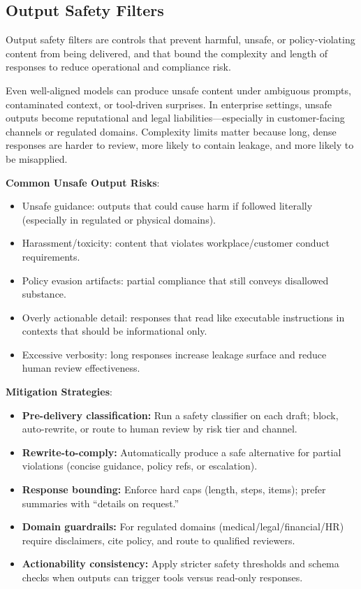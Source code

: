 \begin{TNtwocol}
    \section{Output Safety Filters }

    Output safety filters are controls that prevent harmful, unsafe, or policy-violating content from being delivered, and that bound the complexity and length of responses to reduce operational and compliance risk.

    Even well-aligned models can produce unsafe content under ambiguous prompts, contaminated context, or tool-driven surprises. In enterprise settings, unsafe outputs become reputational and legal liabilities—especially in customer-facing channels or regulated domains. Complexity limits matter because long, dense responses are harder to review, more likely to contain leakage, and more likely to be misapplied.

    \textbf{Common Unsafe Output Risks}:
    \begin{itemize}
        \item Unsafe guidance: outputs that could cause harm if followed literally (especially in regulated or physical domains).
        \item Harassment/toxicity: content that violates workplace/customer conduct requirements.
        \item Policy evasion artifacts: partial compliance that still conveys disallowed substance.
        \item Overly actionable detail: responses that read like executable instructions in contexts that should be informational only.
        \item Excessive verbosity: long responses increase leakage surface and reduce human review effectiveness.
    \end{itemize}

    \textbf{Mitigation Strategies}:
    \begin{itemize}
        \item \textbf{Pre-delivery classification:} Run a safety classifier on each draft; block, auto-rewrite, or route to human review by risk tier and channel.
        \item \textbf{Rewrite-to-comply:} Automatically produce a safe alternative for partial violations (concise guidance, policy refs, or escalation).
        \item \textbf{Response bounding:} Enforce hard caps (length, steps, items); prefer summaries with “details on request.”
        \item \textbf{Domain guardrails:} For regulated domains (medical/legal/financial/HR) require disclaimers, cite policy, and route to qualified reviewers.
        \item \textbf{Actionability consistency:} Apply stricter safety thresholds and schema checks when outputs can trigger tools versus read-only responses.
    \end{itemize}


\end{TNtwocol}
